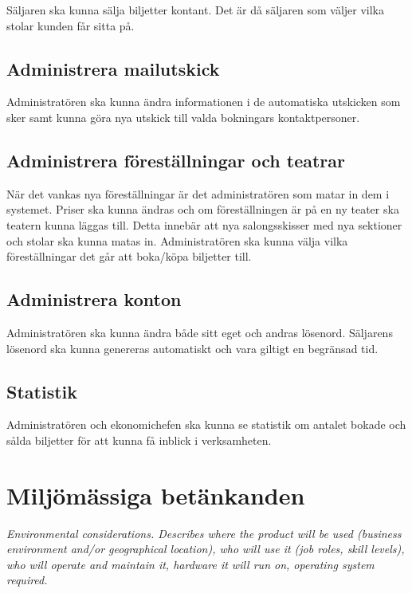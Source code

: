 \documentclass[a4paper, twoside, 11pt, titlepage]{article}
\begin{document}
	Säljaren ska kunna sälja biljetter kontant. Det är då säljaren som väljer vilka stolar kunden får sitta på.

	\subsection{Administrera mailutskick}


	Administratören ska kunna ändra informationen i de automatiska utskicken som sker samt kunna göra nya utskick till valda bokningars kontaktpersoner.

	\subsection{Administrera föreställningar och teatrar}


	När det vankas nya föreställningar är det administratören som matar in dem i systemet. Priser ska kunna ändras och om föreställningen är på en ny teater ska teatern kunna läggas till. Detta innebär att nya salongsskisser med nya sektioner och stolar ska kunna matas in. Administratören ska kunna välja vilka föreställningar det går att boka/köpa biljetter till.

	\subsection{Administrera konton}


	Administratören ska kunna ändra både sitt eget och andras lösenord. Säljarens lösenord ska kunna genereras automatiskt och vara giltigt en begränsad tid.

	\subsection{Statistik}


	Administratören och ekonomichefen ska kunna se statistik om antalet bokade och sålda biljetter för att kunna få inblick i verksamheten.

\clearpage
\section{Miljömässiga betänkanden}


\emph{Environmental considerations. Describes where the product will be used (business environment and/or geographical location), who will use it (job roles, skill levels), who will operate and maintain it, hardware it will run on, operating system required.}
\end{document}
